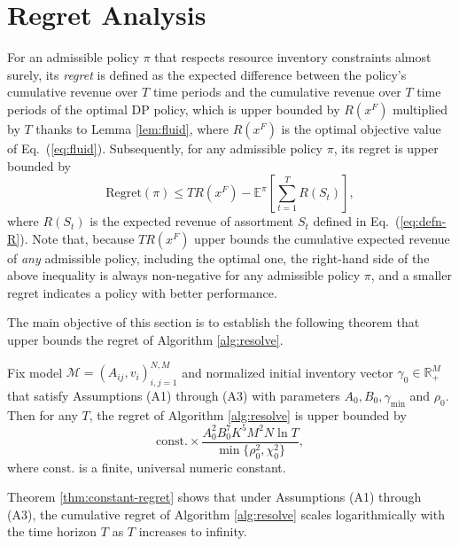 \documentclass[opre]{informs3aa}
\newcommand{\const}{\mathrm{const}}
\begin{document}
\section{Regret Analysis}
\label{sec:regret}

{
For an admissible policy $\pi$ that respects resource inventory constraints almost surely, its \emph{regret} is defined as the expected difference between the policy's cumulative revenue over $T$ time periods and 
the cumulative revenue over $T$ time periods of the optimal DP policy, which is upper bounded by 
$R(x^F)$ multiplied by $T$ thanks to Lemma \ref{lem:fluid}, where $R(x^F)$ is the optimal objective value of Eq.~(\ref{eq:fluid}).
Subsequently, for any admissible policy $\pi$, its regret is upper bounded by
$$
\mathrm{Regret}(\pi) \leq  TR(x^F) - \mathbb E^\pi\left[\sum_{t=1}^T R(S_t)\right],
$$
where $R(S_t)$ is the expected revenue of assortment $S_t$ defined in Eq.~(\ref{eq:defn-R}).
Note that, because $TR(x^F)$ upper bounds the cumulative expected revenue of \emph{any} admissible policy, including the optimal one,
the right-hand side of the above inequality is always non-negative for any admissible policy $\pi$, and a smaller regret indicates a policy with better performance.
}

The main objective of this section is to establish the following theorem that upper bounds the regret of Algorithm \ref{alg:resolve}.
\begin{theorem}
Fix model $\mathcal M=(A_{ij},v_i)_{i,j=1}^{N,M}$ and normalized initial inventory vector $\gamma_0\in\mathbb R_+^M$ that satisfy
Assumptions (A1) through (A3) with parameters $A_0, B_0,\gamma_{\min}$ and $\rho_0$.
Then for any $T$, the regret of Algorithm \ref{alg:resolve} is upper bounded by 
$$
\const.\times\frac{A_0^2B_0^7K^5M^2 N\ln T}{\min\{\rho_0^2,\chi_0^2\}},
$$
where $\const.$ is a finite, universal numeric constant.
\label{thm:constant-regret}
\end{theorem}
{
\begin{remark}
Theorem \ref{thm:constant-regret} shows that under Assumptions (A1) through (A3), the cumulative regret of Algorithm \ref{alg:resolve} scales logarithmically with the time horizon $T$
as $T$ increases to infinity.
\end{remark}
}
\end{document}
